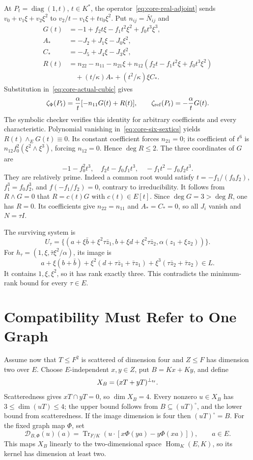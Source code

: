 \documentclass[12pt,letterpaper,onecolumn]{article}
\theoremstyle{definition}
\theoremstyle{remark}
\DeclareMathOperator{\Tr}{Tr}
\DeclareMathOperator{\Hom}{Hom}
\begin{document}
At \(P_t=\operatorname{diag}(1,t)\), \(t\in K^*\), the operator~\eqref{eq:core-real-adjoint} sends
\(v_0+v_1\xi+v_2\xi^2\) to \(v_2/t-v_1\xi+tv_0\xi^2\).
Put \(n_{ij}=\bar N_{ij}\) and
\begin{align*}
G(t)&=-1+f_2t\xi-f_1t^2\xi^2+f_0t^3\xi^3,\\
A_*&=-J_2+J_1\xi-J_0\xi^2,\\
C_*&=-J_5+J_4\xi-J_3\xi^2,\\
R(t)&=n_{22}-n_{11}-n_{21}\xi
       +n_{12}(f_2t-f_1t^2\xi+f_0t^3\xi^2)\\
    &\quad+(t/\kappa)A_*+(t^2/\kappa)\xi C_*.
\end{align*}
Substitution in~\eqref{eq:core-actual-cubic} gives
\[
\zeta_\Phi(P_t)=\frac\alpha t[-n_{11}G(t)+R(t)],
\qquad \zeta_{\rm ref}(P_t)=-\frac\alpha tG(t).
\]
The symbolic checker verifies this identity for arbitrary coefficients and every characteristic.
Polynomial vanishing in~\eqref{eq:core-six-sextics} yields \(R(t)\wedge_EG(t)\equiv0\).
Its constant coefficient forces \(n_{21}=0\); its coefficient of \(t^6\) is
\(n_{12}f_0^2(\xi^2\wedge\xi^3)\), forcing \(n_{12}=0\).
Hence \(\deg R\le2\).
The three coordinates of \(G\) are
\[
-1-f_0^2t^3,\quad f_2t-f_0f_1t^3,\quad -f_1t^2-f_0f_2t^3.
\]
They are relatively prime. Indeed a common root would satisfy
\(t=-f_1/(f_0f_2)\), \(f_1^3=f_0f_2^3\), and
\(f(-f_1/f_2)=0\), contrary to irreducibility.
It follows from \(R\wedge G=0\) that \(R=c(t)G\) with \(c(t)\in E[t]\).
Since \(\deg G=3>\deg R\), one has \(R=0\).
Its coefficients give \(n_{22}=n_{11}\) and \(A_*=C_*=0\), so all \(J_i\) vanish and \(N=\tau I\).

The surviving system is
\[
U_\tau=\{(a+\xi\bar b+\xi^2\tau\bar z_1,
 b+\xi d+\xi^2\tau\bar z_2,\alpha(z_1+\xi z_2))\}.
\]
For \(h_\tau=(1,\xi,\bar\tau\xi^2/\alpha)\), its image is
\[
a+\xi(b+\bar b)
+\xi^2(d+\tau\bar z_1+\bar\tau z_1)
+\xi^3(\tau\bar z_2+\bar\tau z_2)\in L.
\]
It contains \(1,\xi,\xi^2\), so it has rank exactly three. This contradicts the minimum-rank bound for every \(\tau\in E\).

\section{Compatibility Must Refer to One Graph}
Assume now that \(T\le F^2\) is scattered of dimension four and \(Z\le F\) has dimension two over \(E\).
Choose \(E\)-independent \(x,y\in Z\), put \(B=Kx+Ky\), and define
\[
X_B=(xT+yT)^{\perp_{\rm tr}}.
\]
Scatteredness gives \(xT\cap yT=0\), so \(\dim X_B=4\).
Every nonzero \(u\in X_B\) has \(3\le\dim(uT)\le4\); the upper bound follows from \(B\subseteq(uT)^\circ\), and the lower bound from scatteredness. If the image dimension is four then \((uT)^\circ=B\).
For the fixed graph map \(\Phi\), set
\begin{equation}\label{eq:core-D}
\mathcal D_{B,\Phi}(u)(a)
=\Tr_{F/K}\!\left(u\cdot[x\Phi(ya)-y\Phi(xa)]\right),
\qquad a\in E.
\end{equation}
This maps \(X_B\) linearly to the two-dimensional space \(\Hom_K(E,K)\), so its kernel has dimension at least two.
\end{document}
